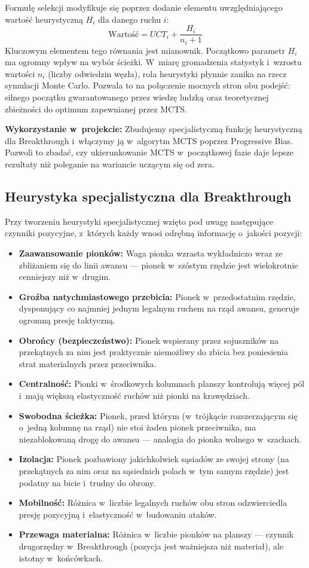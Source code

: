 \documentclass[12pt,a4paper]{article}
\begin{document}
Formułę selekcji modyfikuje się poprzez dodanie elementu uwzględniającego wartość heurystyczną $H_i$ dla danego ruchu $i$:
$$ \text{Wartość} = UCT_i + \frac{H_i}{n_i + 1} $$
Kluczowym elementem tego równania jest mianownik. Początkowo parametr $H_i$ ma ogromny wpływ na wybór ścieżki. W~miarę gromadzenia statystyk i~wzrostu wartości $n_i$ (liczby odwiedzin węzła), rola heurystyki płynnie zanika na rzecz symulacji Monte Carlo. Pozwala to na połączenie mocnych stron obu podejść: silnego początku gwarantowanego przez wiedzę ludzką oraz teoretycznej zbieżności do optimum zapewnianej przez MCTS.

\textbf{Wykorzystanie w~projekcie:} Zbudujemy specjalistyczną funkcję heurystyczną dla Breakthrough i~włączymy ją w~algorytm MCTS poprzez Progressive Bias. Pozwoli to zbadać, czy ukierunkowanie MCTS w~początkowej fazie daje lepsze rezultaty niż poleganie na wariancie uczącym się od zera.

\subsection{Heurystyka specjalistyczna dla Breakthrough}

Przy tworzeniu heurystyki specjalistycznej wzięto pod uwagę następujące czynniki pozycyjne, z~których każdy wnosi odrębną informację o~jakości pozycji:
\begin{itemize}[leftmargin=2em]
  \item \textbf{Zaawansowanie pionków:} Waga pionka wzrasta wykładniczo wraz ze zbliżaniem się do linii awansu --- pionek w~szóstym rzędzie jest wielokrotnie cenniejszy niż w~drugim.
  \item \textbf{Groźba natychmiastowego przebicia:} Pionek w~przedostatnim rzędzie, dysponujący co najmniej jednym legalnym ruchem na rząd awansu, generuje ogromną presję taktyczną.
  \item \textbf{Obrońcy (bezpieczeństwo):} Pionek wspierany przez sojuszników na przekątnych za nim jest praktycznie niemożliwy do zbicia bez poniesienia strat materialnych przez przeciwnika.
  \item \textbf{Centralność:} Pionki w~środkowych kolumnach planszy kontrolują więcej pól i~mają większą elastyczność ruchów niż pionki na krawędziach.
  \item \textbf{Swobodna ścieżka:} Pionek, przed którym (w~trójkącie rozszerzającym się o~jedną kolumnę na rząd) nie stoi żaden pionek przeciwnika, ma niezablokowaną drogę do awansu --- analogia do pionka wolnego w~szachach.
  \item \textbf{Izolacja:} Pionek pozbawiony jakichkolwiek sąsiadów ze swojej strony (na przekątnych za nim oraz na sąsiednich polach w~tym samym rzędzie) jest podatny na bicie i~trudny do obrony.
  \item \textbf{Mobilność:} Różnica w~liczbie legalnych ruchów obu stron odzwierciedla presję pozycyjną i~elastyczność w~budowaniu ataków.
  \item \textbf{Przewaga materialna:} Różnica w~liczbie pionków na planszy --- czynnik drugorzędny w~Breakthrough (pozycja jest ważniejsza niż materiał), ale istotny w~końcówkach.
\end{itemize}
\end{document}
